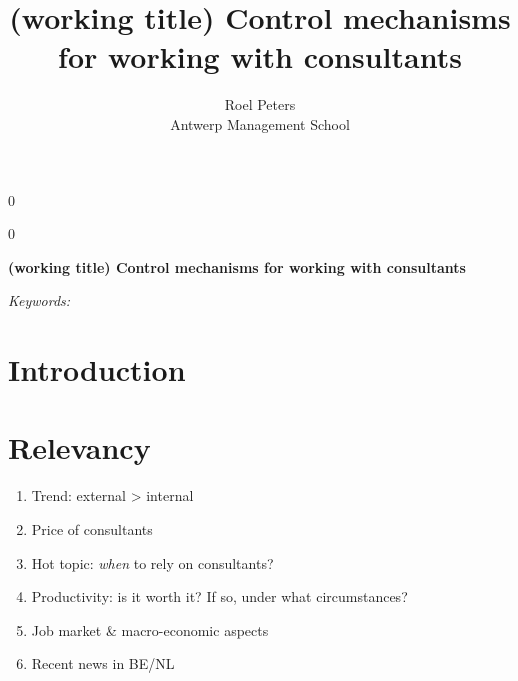\documentclass[12pt]{article}
\newcommand{\blind}{0}
\providecommand{\tightlist}{%
  \setlength{\itemsep}{0pt}\setlength{\parskip}{0pt}}
\begin{document}
\def\spacingset#1{\renewcommand{\baselinestretch}%
{#1}\small\normalsize} \spacingset{1}



\blind
{
  \title{\bf (working title) Control mechanisms for working with
consultants}

  \author{
        Roel Peters \\
    Antwerp Management School\\
      }
  \maketitle
} \fi

\blind
{
  \bigskip
  \bigskip
  \bigskip
  \begin{center}
    {\LARGE\bf (working title) Control mechanisms for working with
consultants}
  \end{center}
  \medskip
} \fi

\bigskip
\begin{abstract}

\end{abstract}

\noindent%
{\it Keywords:} 
\vfill

\newpage
\spacingset{1.45} %

\hypertarget{introduction}{%
\section{Introduction}\label{introduction}}

\hypertarget{relevancy}{%
\section{Relevancy}\label{relevancy}}

\begin{enumerate}
\def\labelenumi{\arabic{enumi}.}
\tightlist
\item
  Trend: external \textgreater{} internal
\item
  Price of consultants
\item
  Hot topic: \emph{when} to rely on consultants?
\item
  Productivity: is it worth it? If so, under what circumstances?
\item
  Job market \& macro-economic aspects
\item
  Recent news in BE/NL
\end{enumerate}
\end{document}
